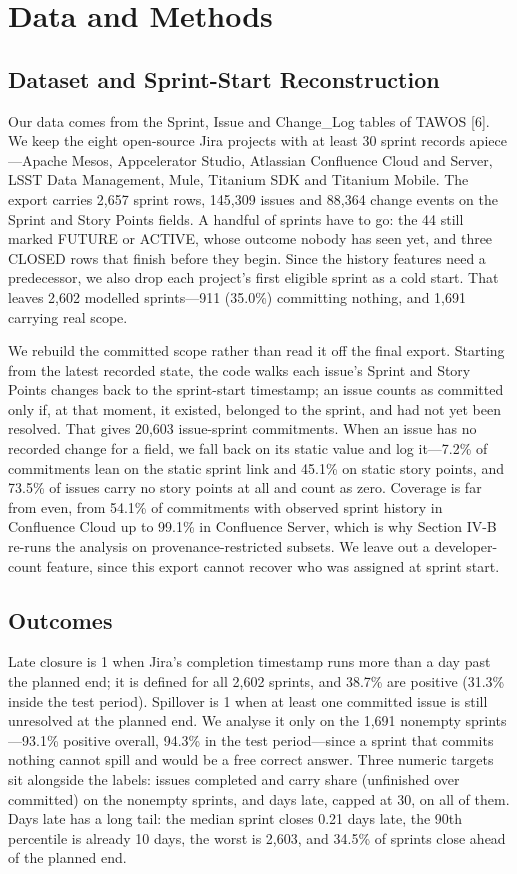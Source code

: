 \documentclass[conference]{IEEEtran}
\begin{document}
\section{Data and Methods}

\subsection{Dataset and Sprint-Start Reconstruction}

Our data comes from the Sprint, Issue and Change\_Log tables of TAWOS [6]. We keep the eight open-source Jira projects with at least 30 sprint records apiece---Apache Mesos, Appcelerator Studio, Atlassian Confluence Cloud and Server, LSST Data Management, Mule, Titanium SDK and Titanium Mobile. The export carries 2,657 sprint rows, 145,309 issues and 88,364 change events on the Sprint and Story Points fields. A handful of sprints have to go: the 44 still marked FUTURE or ACTIVE, whose outcome nobody has seen yet, and three CLOSED rows that finish before they begin. Since the history features need a predecessor, we also drop each project's first eligible sprint as a cold start. That leaves 2,602 modelled sprints---911 (35.0\%) committing nothing, and 1,691 carrying real scope.

We rebuild the committed scope rather than read it off the final export. Starting from the latest recorded state, the code walks each issue's Sprint and Story Points changes back to the sprint-start timestamp; an issue counts as committed only if, at that moment, it existed, belonged to the sprint, and had not yet been resolved. That gives 20,603 issue-sprint commitments. When an issue has no recorded change for a field, we fall back on its static value and log it---7.2\% of commitments lean on the static sprint link and 45.1\% on static story points, and 73.5\% of issues carry no story points at all and count as zero. Coverage is far from even, from 54.1\% of commitments with observed sprint history in Confluence Cloud up to 99.1\% in Confluence Server, which is why Section IV-B re-runs the analysis on provenance-restricted subsets. We leave out a developer-count feature, since this export cannot recover who was assigned at sprint start.

\subsection{Outcomes}

Late closure is 1 when Jira's completion timestamp runs more than a day past the planned end; it is defined for all 2,602 sprints, and 38.7\% are positive (31.3\% inside the test period). Spillover is 1 when at least one committed issue is still unresolved at the planned end. We analyse it only on the 1,691 nonempty sprints---93.1\% positive overall, 94.3\% in the test period---since a sprint that commits nothing cannot spill and would be a free correct answer. Three numeric targets sit alongside the labels: issues completed and carry share (unfinished over committed) on the nonempty sprints, and days late, capped at 30, on all of them. Days late has a long tail: the median sprint closes 0.21 days late, the 90th percentile is already 10 days, the worst is 2,603, and 34.5\% of sprints close ahead of the planned end.
\end{document}
